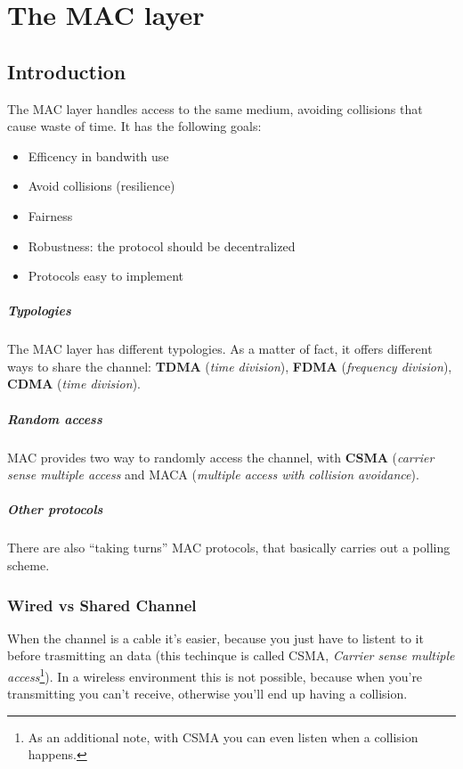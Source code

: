 \chapter{The MAC layer}

\section{Introduction}

The MAC layer handles access to the same medium, avoiding collisions that cause
waste of time.
It has the following goals:
\begin{itemize}
\item Efficency in bandwith use
\item Avoid collisions (resilience)
\item Fairness
\item Robustness: the protocol should be decentralized
\item Protocols easy to implement
\end{itemize}

\paragraph*{Typologies} The MAC layer has different typologies. As a matter of
fact, it offers different
ways to share the channel: \textbf{TDMA} (\textit{time division}), \textbf{FDMA}
(\textit{frequency division}), \textbf{CDMA} (\textit{time division}).
\paragraph*{Random access} MAC provides two way to randomly access the channel,
with \textbf{CSMA}
(\textit{carrier sense multiple access} and MACA (\textit{multiple access with
  collision avoidance}).
\paragraph*{Other protocols} There are also ``taking turns'' MAC protocols, that
basically carries out a
polling scheme.

\subsection{Wired vs Shared Channel}

When the channel is a cable it's easier, because you just have to listent to it
before trasmitting an data (this techinque is called CSMA, \textit{Carrier sense
  multiple access}\footnote{As an additional note, with CSMA you can even listen
  when a collision happens.}). In a wireless environment this is not possible,
because when you're transmitting you can't receive, otherwise you'll end up
having a collision.

